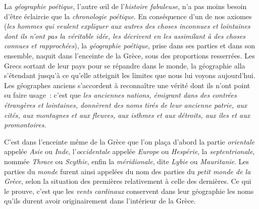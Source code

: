 \documentclass[french,twoside]{book} %
\newcommand\chaptercont{} %
\begin{document}
\chaptercont
\noindent  La {\itshape géographie poétique}, l’autre œil de l’{\itshape histoire fabuleuse}, n’a pas moins besoin d’être éclaircie que la {\itshape chronologie poétique}. En conséquence d’un de nos axiomes ({\itshape les hommes qui veulent expliquer aux autres des choses inconnues et lointaines dont ils n’ont pas la véritable idée, les décrivent en les assimilant à des choses connues et rapprochées}), la {\itshape géographie poétique}, prise dans ses parties et dans son ensemble, naquit dans l’enceinte de la Grèce, sous des proportions resserrées. Les Grecs sortant de leur pays pour se répandre dans le monde, la géographie alla s’étendant jusqu’à ce qu’elle atteignit les limites que nous lui voyons aujourd’hui. Les géographes anciens s’accordent à reconnaître une vérité dont ils n’ont point su faire usage : c’est que {\itshape les anciennes nations, émigrant dans des contrées étrangères et lointaines, donnèrent des noms tirés de leur ancienne patrie, aux cités, aux montagnes et aux fleuves, aux isthmes et aux détroits, aux îles et aux promontoires}.\par
 C’est dans l’enceinte même de la Grèce que l’on plaça d’abord la partie {\itshape orientale} appelée {\itshape Asie} ou {\itshape Inde}, l’{\itshape occidentale} appelée {\itshape Europe} ou {\itshape Hespérie}, la {\itshape septentrionale}, nommée {\itshape Thrace} ou {\itshape Scythie}, enfin la {\itshape méridionale}, dite {\itshape Lybie} ou {\itshape Mauritanie}. Les parties du {\itshape monde} furent ainsi appelées du nom des parties du {\itshape petit monde de la Grèce}, selon la situation des premières relativement à celle des dernières. Ce qui le prouve, c’est que les {\itshape vents cardinaux} conservent dans leur géographie les noms qu’ils durent avoir originairement dans l’intérieur de la Grèce.\par
\end{document}
